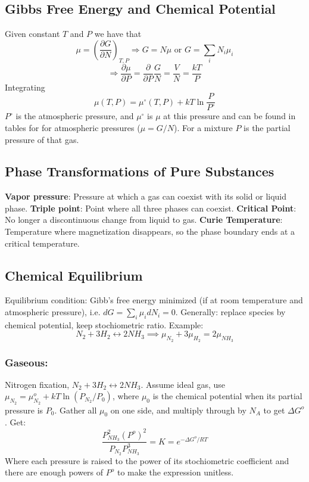 \documentclass[a4paper,norsk, 10pt]{article}
\newcommand{\pd}[3]{\left(\frac{\partial #1}{\partial #2}\right)_{#3}}
\begin{document}
\subsection{Gibbs Free Energy and Chemical Potential}
Given constant $T$ and $P$ we have that
\begin{equation}
\mu = \pd{G}{N}{T,P} \Rightarrow G = N\mu \text{ or } G = \sum_i N_i \mu_i
\end{equation}
\begin{equation}
\Rightarrow\frac{\partial \mu}{\partial P} = \frac{\partial}{\partial P}\frac{G}{N} = \frac{V}{N} = \frac{kT}{P}
\end{equation}
Integrating
\begin{equation}
\mu(T,P) = \mu^\circ(T,P) + kT \ln\frac{P}{P^\circ}
\end{equation}
$P^\circ$ is the atmospheric pressure, and $\mu^\circ$ is $\mu$ at this pressure and can be found in tables for for atmospheric pressures ($\mu = G/N$).  For a mixture $P$ is the partial pressure of that gas.

\subsection{Phase Transformations of Pure Substances}
\textbf{Vapor pressure}: Pressure at which a gas can coexist with its solid or liquid phase. \textbf{Triple point}: Point where all three phases can coexist. \textbf{Critical Point}: No longer a discontinuous change from liquid to gas. \textbf{Curie Temperature}: Temperature where magnetization disappears, so the phase boundary ends at a critical temperature.

\subsection{Chemical Equilibrium}
Equilibrium condition: Gibb's free energy minimized (if at room temperature and atmospheric pressure), i.e. $dG=\sum_i \mu_idN_i=0$. Generally: replace species by chemical potential, keep stochiometric ratio. Example:
\begin{equation}
N_2+3H_2 \leftrightarrow 2NH_3 \implies \mu_{N_2}+3\mu_{H_2}=2\mu_{NH_3}
\end{equation}
\subsubsection{Gaseous:}
Nitrogen fixation, $N_2+3H_2 \leftrightarrow 2NH_3$. Assume ideal gas, use $\mu_{N_2}=\mu^o_{N_2}+kT\ln\left(P_{N_2}/P_0\right)$, where $\mu_0$ is the chemical potential when its partial pressure is $P_0$. Gather all $\mu_0$ on one side, and multiply through by $N_A$ to get $\Delta G^o$. Get:
\begin{equation}
\frac{P^2_{NH_3}(P^o)^2}{P_{N_2}P^3_{NH_3}}=K=e^{-\Delta G^o/RT}
\end{equation}
Where each pressure is raised to the power of its stochiometric coefficient and there are enough powers of $P^o$ to make the expression unitless.
\end{document}
